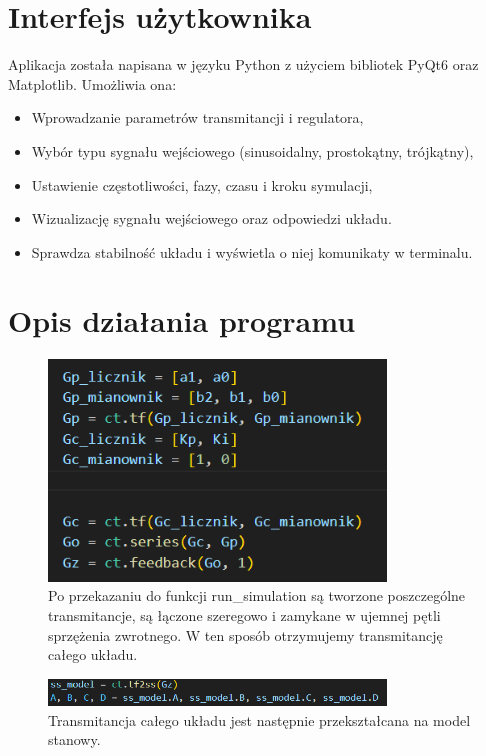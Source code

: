 \documentclass[12pt,a4paper]{article}
\begin{document}
\section{Interfejs użytkownika}
Aplikacja została napisana w języku Python z użyciem bibliotek PyQt6 oraz Matplotlib. Umożliwia ona:
\begin{itemize}
    \item Wprowadzanie parametrów transmitancji i regulatora,
    \item Wybór typu sygnału wejściowego (sinusoidalny, prostokątny, trójkątny),
    \item Ustawienie częstotliwości, fazy, czasu i kroku symulacji,
    \item Wizualizację sygnału wejściowego oraz odpowiedzi układu.
    \item Sprawdza stabilność układu i wyświetla o niej komunikaty w terminalu.
\end{itemize}

\section{Opis działania programu}
\begin{figure}[h!]
    \centering
    \includegraphics[width=0.8\textwidth]{wykres2.png}
    \caption{Po przekazaniu do funkcji run\_simulation są tworzone poszczególne transmitancje, są łączone szeregowo i zamykane w ujemnej pętli sprzężenia zwrotnego. W ten sposób otrzymujemy transmitancję całego układu.}
\end{figure}

\begin{figure}[h!]
    \centering
    \includegraphics[width=0.8\textwidth]{model.png}
    \caption{Transmitancja całego układu jest następnie przekształcana na model stanowy.}
\end{figure}
\end{document}
